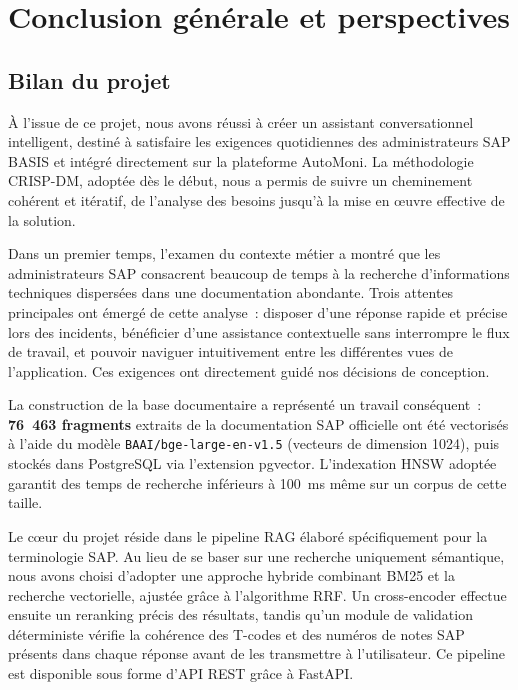 
\chapter*{Conclusion générale et perspectives}

\section*{Bilan du projet}

À l'issue de ce projet, nous avons réussi à créer un assistant conversationnel intelligent, destiné à satisfaire les exigences quotidiennes des administrateurs SAP BASIS et intégré directement sur la plateforme AutoMoni. La méthodologie CRISP-DM, adoptée dès le début, nous a permis de suivre un cheminement cohérent et itératif, de l'analyse des besoins jusqu'à la mise en œuvre effective de la solution.

Dans un premier temps, l'examen du contexte métier a montré que les administrateurs SAP consacrent beaucoup de temps à la recherche d'informations techniques dispersées dans une documentation abondante. Trois attentes principales ont émergé de cette analyse~: disposer d'une réponse rapide et précise lors des incidents, bénéficier d'une assistance contextuelle sans interrompre le flux de travail, et pouvoir naviguer intuitivement entre les différentes vues de l'application. Ces exigences ont directement guidé nos décisions de conception.

La construction de la base documentaire a représenté un travail conséquent~: \textbf{76~463 fragments} extraits de la documentation SAP officielle ont été vectorisés à l'aide du modèle \texttt{BAAI/bge-large-en-v1.5} (vecteurs de dimension 1024), puis stockés dans PostgreSQL via l'extension pgvector. L'indexation HNSW adoptée garantit des temps de recherche inférieurs à 100~ms même sur un corpus de cette taille.

Le cœur du projet réside dans le pipeline RAG élaboré spécifiquement pour la terminologie SAP. Au lieu de se baser sur une recherche uniquement sémantique, nous avons choisi d'adopter une approche hybride combinant BM25 et la recherche vectorielle, ajustée grâce à l'algorithme RRF. Un cross-encoder effectue ensuite un reranking précis des résultats, tandis qu'un module de validation déterministe vérifie la cohérence des T-codes et des numéros de notes SAP présents dans chaque réponse avant de les transmettre à l'utilisateur. Ce pipeline est disponible sous forme d'API REST grâce à FastAPI.

